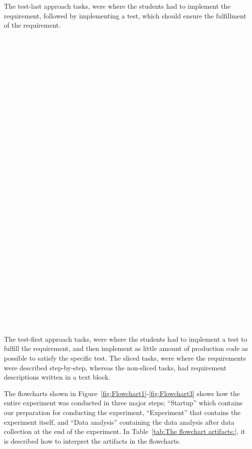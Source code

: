 \documentclass{sig-alternate-05-2015}
\begin{document}
The test-last approach tasks, were where the students had to implement the requirement, followed by implementing a test, which should ensure the fulfillment of the requirement.\\\\\\\\\\\\\\\\\\\\\\\\\\\\\\\\\\\\\\\\\\\\\\\\\\\\\\\\\\\\\\\\\\
The test-first approach tasks, were where the students had to implement a test to fulfill the requirement, and then implement as little amount of production code as possible to satisfy the specific test.
The sliced tasks, were where the requirements were described step-by-step, whereas the non-sliced tasks, had requirement descriptions written in a text block.

The flowcharts shown in Figure~\ref{fig:Flowchart1}-\ref{fig:Flowchart3} shows how the entire experiment was conducted in three major steps; ``Startup'' which contains our preparation for conducting the experiment, ``Experiment'' that contains the experiment itself, and ``Data analysis'' containing the data analysis after data collection at the end of the experiment. In Table~\ref{tab:The flowchart artifacts:}, it is described how to interpret the artifacts in the flowcharts.
\end{document}
